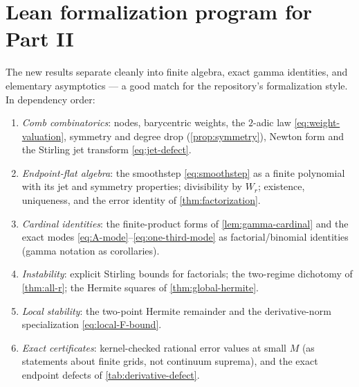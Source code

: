 \section{Lean formalization program for Part II}
\label{sec:lean-interp}

The new results separate cleanly into finite algebra, exact gamma
identities, and elementary asymptotics --- a good match for the
repository's formalization style.  In dependency order:

\begin{enumerate}
\item\emph{Comb combinatorics}: nodes, barycentric weights, the
$2$-adic law \eqref{eq:weight-valuation}, symmetry and degree drop
(\cref{prop:symmetry}), Newton form and the Stirling jet transform
\eqref{eq:jet-defect}.
\item\emph{Endpoint-flat algebra}: the smoothstep
\eqref{eq:smoothstep} as a finite polynomial with its jet and
symmetry properties; divisibility by $W_r$; existence, uniqueness,
and the error identity of \cref{thm:factorization}.
\item\emph{Cardinal identities}: the finite-product forms of
\cref{lem:gamma-cardinal} and the exact modes
\eqref{eq:A-mode}--\eqref{eq:one-third-mode} as factorial/binomial
identities (gamma notation as corollaries).
\item\emph{Instability}: explicit Stirling bounds for factorials; the
two-regime dichotomy of \cref{thm:all-r}; the Hermite squares of
\cref{thm:global-hermite}.
\item\emph{Local stability}: the two-point Hermite remainder and the
derivative-norm specialization \eqref{eq:local-F-bound}.
\item\emph{Exact certificates}: kernel-checked rational error values
at small $M$ (as statements about finite grids, not continuum
suprema), and the exact endpoint defects of
\cref{tab:derivative-defect}.
\end{enumerate}

